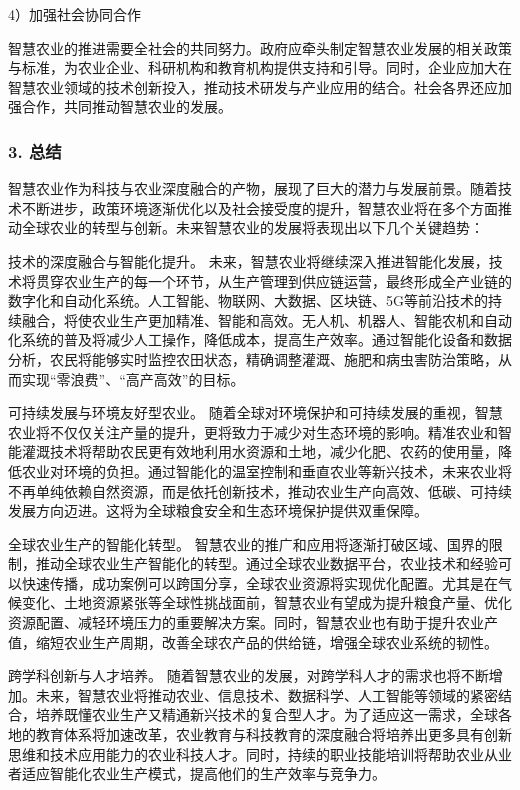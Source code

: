 4）加强社会协同合作

智慧农业的推进需要全社会的共同努力。政府应牵头制定智慧农业发展的相关政策与标准，为农业企业、科研机构和教育机构提供支持和引导。同时，企业应加大在智慧农业领域的技术创新投入，推动技术研发与产业应用的结合。社会各界还应加强合作，共同推动智慧农业的发展。


\subsubsection{3. 总结}


智慧农业作为科技与农业深度融合的产物，展现了巨大的潜力与发展前景。随着技术不断进步，政策环境逐渐优化以及社会接受度的提升，智慧农业将在多个方面推动全球农业的转型与创新。未来智慧农业的发展将表现出以下几个关键趋势：  

技术的深度融合与智能化提升。
未来，智慧农业将继续深入推进智能化发展，技术将贯穿农业生产的每一个环节，从生产管理到供应链运营，最终形成全产业链的数字化和自动化系统。人工智能、物联网、大数据、区块链、5G等前沿技术的持续融合，将使农业生产更加精准、智能和高效。无人机、机器人、智能农机和自动化系统的普及将减少人工操作，降低成本，提高生产效率。通过智能化设备和数据分析，农民将能够实时监控农田状态，精确调整灌溉、施肥和病虫害防治策略，从而实现“零浪费”、“高产高效”的目标。  

可持续发展与环境友好型农业。
随着全球对环境保护和可持续发展的重视，智慧农业将不仅仅关注产量的提升，更将致力于减少对生态环境的影响。精准农业和智能灌溉技术将帮助农民更有效地利用水资源和土地，减少化肥、农药的使用量，降低农业对环境的负担。通过智能化的温室控制和垂直农业等新兴技术，未来农业将不再单纯依赖自然资源，而是依托创新技术，推动农业生产向高效、低碳、可持续发展方向迈进。这将为全球粮食安全和生态环境保护提供双重保障。  

全球农业生产的智能化转型。
智慧农业的推广和应用将逐渐打破区域、国界的限制，推动全球农业生产智能化的转型。通过全球农业数据平台，农业技术和经验可以快速传播，成功案例可以跨国分享，全球农业资源将实现优化配置。尤其是在气候变化、土地资源紧张等全球性挑战面前，智慧农业有望成为提升粮食产量、优化资源配置、减轻环境压力的重要解决方案。同时，智慧农业也有助于提升农业产值，缩短农业生产周期，改善全球农产品的供给链，增强全球农业系统的韧性。  

跨学科创新与人才培养。
随着智慧农业的发展，对跨学科人才的需求也将不断增加。未来，智慧农业将推动农业、信息技术、数据科学、人工智能等领域的紧密结合，培养既懂农业生产又精通新兴技术的复合型人才。为了适应这一需求，全球各地的教育体系将加速改革，农业教育与科技教育的深度融合将培养出更多具有创新思维和技术应用能力的农业科技人才。同时，持续的职业技能培训将帮助农业从业者适应智能化农业生产模式，提高他们的生产效率与竞争力。  

